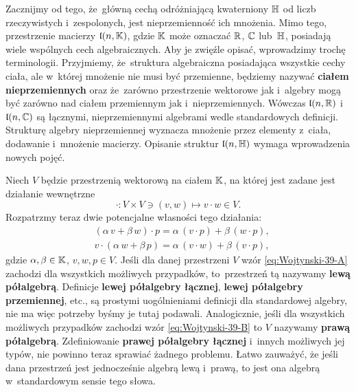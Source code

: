 \documentclass[a4paper,11pt]{article}
\begin{document}
Zacznijmy od tego, że~główną cechą odróżniającą kwaterniony $\mathbb{H}$ od liczb
rzeczywistych i~zespolonych, jest nieprzemienność ich mnożenia. Mimo tego,
przestrzenie macierzy $\mathfrak{l}( n, \mathbb{K} )$, gdzie $\mathbb{K}$ może oznaczać
$\mathbb{R}$, $\mathbb{C}$ lub~$\mathbb{H}$, posiadają wiele wspólnych cech algebraicznych.
Aby je zwięźle opisać, wprowadzimy trochę terminologii. Przyjmiemy,
że~struktura algebraiczna posiadająca wszystkie cechy ciała, ale w~której
mnożenie nie musi być przemienne, będziemy nazywać \textbf{ciałem
  nieprzemiennych} oraz że~zarówno przestrzenie wektorowe jak i~algebry mogą
być zarówno nad ciałem przemiennym jak i~nieprzemiennych. Wówczas
$\mathfrak{l}( n, \mathbb{R} )$ i~$\mathfrak{l}( n, \mathbb{C} )$ są łącznymi, nieprzemiennymi
algebrami wedle standardowych definicji. Strukturę algebry nieprzemiennej
wyznacza mnożenie przez elementy z~ciała, dodawanie i~mnożenie macierzy.
Opisanie struktur $\mathfrak{l}( n, \mathbb{H} )$ wymaga wprowadzenia nowych pojęć.

Niech $V$ będzie przestrzenią wektorową na ciałem $\mathbb{K}$, na której jest
zadane jest działanie wewnętrzne
\begin{equation}
  \label{eq:Wojtynsi-38}
  \cdot : V \times V \ni ( v, w ) \mapsto v \cdot w \in V.
\end{equation}
Rozpatrzmy teraz dwie potencjalne własności tego działania:
\begin{subequations}
  \begin{align}
    \label{eq:Wojtynski-39-A}
    &( \alpha \, v + \beta \, w ) \cdot p  =  \alpha \, ( v \cdot p ) + \beta \, ( w \cdot p ), \\
    \label{eq:Wojtynski-39-B}
    &v \cdot ( \alpha \, w + \beta \, p ) = \alpha \, ( v \cdot w ) + \beta \, ( v \cdot p ),
  \end{align}
\end{subequations}
gdzie $\alpha, \beta \in \mathbb{K}$, $v, w, p \in V$. Jeśli dla danej przestrzeni $V$ wzór
\eqref{eq:Wojtynski-39-A} zachodzi dla wszystkich możliwych przypadków,
to~przestrzeń tą nazywamy \textbf{lewą półalgebrą}. Definicje \textbf{lewej
  półalgebry łącznej}, \textbf{lewej półalgebry przemiennej}, etc., są
prostymi uogólnieniami definicji dla standardowej algebry, nie ma więc
potrzeby byśmy je tutaj podawali. Analogicznie, jeśli dla wszystkich
możliwych przypadków zachodzi wzór \eqref{eq:Wojtynski-39-B} to $V$ nazywamy
\textbf{prawą półalgebrą}. Zdefiniowanie \textbf{prawej półalgebry łącznej}
i~innych możliwych jej typów, nie powinno teraz sprawiać żadnego problemu.
Łatwo zauważyć, że jeśli dana przestrzeń jest jednocześnie algebrą lewą
i~prawą, to jest ona algebrą w~standardowym sensie tego słowa.
\end{document}
